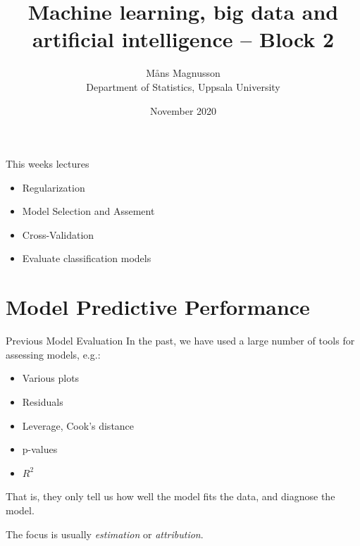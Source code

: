 \documentclass[10pt,handout]{beamer}
\title[]{{\color{black}Machine learning, big data and artificial intelligence -- Block 2}}
\author[]{M{\aa}ns Magnusson\\Department of Statistics, Uppsala University}
\date{November 2020}
\begin{document}
\frame{\titlepage
}



\begin{frame}{This weeks lectures}
\begin{itemize}
\item Regularization
\item Model Selection and Assement
\item Cross-Validation
\item Evaluate classification models
\end{itemize}
\end{frame}




\section{Model Predictive Performance}
\frame{\sectionpage}

\begin{frame}{Previous Model Evaluation}
In the past, we have used a large number of tools for assessing models, e.g.:

\begin{itemize}
\item Various plots
\item Residuals
\item Leverage, Cook's distance
\item p-values
\item $R^2$
\end{itemize}

That is, they only tell us {\color{uured}how well the model fits the data}, and diagnose the model. \pause

The focus is usually \emph{estimation} or \emph{attribution}.
\end{frame}
\end{document}
